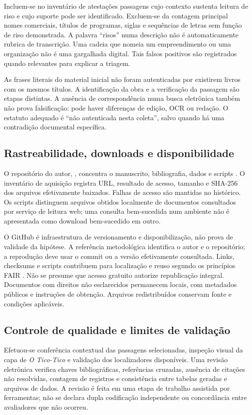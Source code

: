 Incluem-se no inventário de atestações passagens cujo contexto sustenta leitura de riso e cujo suporte pode ser identificado. Excluem-se da contagem principal nomes comerciais, títulos de programas, siglas e sequências de letras sem função de riso demonstrada. A palavra ``risos'' numa descrição não é automaticamente rubrica de transcrição. Uma cadeia  que nomeia um empreendimento ou uma organização não é uma gargalhada digital. Tais falsos positivos são registrados quando relevantes para explicar a triagem.

As frases literais do material inicial não foram autenticadas por existirem livros com os mesmos títulos. A identificação da obra e a verificação da passagem são etapas distintas. A ausência de correspondência numa busca eletrônica também não prova falsificação: pode haver diferenças de edição, OCR ou redação. O estatuto adequado é ``não autenticada nesta coleta'', salvo quando há uma contradição documental específica.

\subsection{Rastreabilidade, downloads e disponibilidade}
O repositório do autor, \repo, concentra o manuscrito, bibliografia, dados e scripts \cite{souzaRepositorio2026}. O inventário de aquisição registra URL, resultado de acesso, tamanho e SHA-256 dos arquivos efetivamente baixados. Falhas de acesso são mantidas no histórico. Os scripts distinguem arquivos obtidos localmente de documentos consultados por serviço de leitura web; uma consulta bem-sucedida num ambiente não é apresentada como download bem-sucedido em outro.

O GitHub é infraestrutura de versionamento e disponibilização, não prova de validade da hipótese. A referência metodológica identifica o autor e o repositório; a reprodução deve usar o commit ou a versão efetivamente consultada. Links, checksums e scripts contribuem para localização e reuso segundo os princípios FAIR \cite{wilkinson2016}. Não se presume que acesso gratuito autorize republicação integral. Documentos com direitos não esclarecidos permanecem locais, com metadados públicos e instruções de obtenção. Arquivos redistribuídos conservam fonte e condições aplicáveis.

\subsection{Controle de qualidade e limites de validação}
Efetuou-se conferência contextual das passagens selecionadas, inspeção visual da capa de \textit{O Tico-Tico} e validação dos localizadores disponíveis. Uma revisão eletrônica verifica chaves bibliográficas, referências cruzadas, ausência de citações não resolvidas, contagem de registros e consistência entre tabelas geradas e arquivos de dados. A revisão é feita em uma etapa de trabalho assistida por ferramentas; não se declara dupla codificação independente ou concordância entre avaliadores que não ocorreu.

